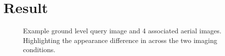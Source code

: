 \section{Result}

\begin{figure}[ht] 
\centering
{}
\caption[]{ Example ground level query image and 4 associated aerial images.  Highlighting the appearance difference in across the two imaging conditions.}
\label{result}
\end{figure}

\label{sec:result}


